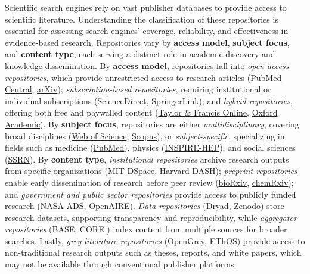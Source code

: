 Scientific search engines rely on vast publisher databases to provide access to scientific literature. Understanding the classification of these repositories is essential for assessing search engines' coverage, reliability, and effectiveness in evidence-based research. Repositories vary by \textbf{access model}, \textbf{subject focus}, and \textbf{content type}, each serving a distinct role in academic discovery and knowledge dissemination. By \textbf{access model}, repositories fall into \textit{open access repositories}, which provide unrestricted access to research articles (\eg \href{https://pubmed.ncbi.nlm.nih.gov/}{PubMed Central}, \href{https://arxiv.org/}{arXiv}); \textit{subscription-based repositories}, requiring institutional or individual subscriptions (\eg \href{https://www.sciencedirect.com/}{ScienceDirect}, \href{https://link.springer.com/}{SpringerLink}); and \textit{hybrid repositories}, offering both free and paywalled content (\eg \href{https://www.tandfonline.com/}{Taylor \& Francis Online}, \href{https://academic.oup.com/}{Oxford Academic}). By \textbf{subject focus}, repositories are either \textit{multidisciplinary}, covering broad disciplines (\eg \href{https://clarivate.com/academia-government/scientific-and-academic-research/research-discovery-and-referencing/web-of-science/}{Web of Science}, \href{https://www.scopus.com/home.uri}{Scopus}), or \textit{subject-specific}, specializing in fields such as medicine (\href{https://pubmed.ncbi.nlm.nih.gov/}{PubMed}), physics (\href{https://inspirehep.net/}{INSPIRE-HEP}), and social sciences (\href{https://www.ssrn.com/index.cfm/en/}{SSRN}). By \textbf{content type}, \textit{institutional repositories} archive research outputs from specific organizations (\eg \href{https://dspace.mit.edu/}{MIT DSpace}, \href{https://dash.harvard.edu/}{Harvard DASH}); \textit{preprint repositories} enable early dissemination of research before peer review (\eg \href{https://www.biorxiv.org/}{bioRxiv}, \href{https://chemrxiv.org/engage/chemrxiv/public-dashboard}{chemRxiv}); and \textit{government and public sector repositories} provide access to publicly funded research (\eg \href{https://ui.adsabs.harvard.edu/}{NASA ADS}, \href{https://www.openaire.eu/}{OpenAIRE}). \textit{Data repositories} (\eg \href{https://datadryad.org/stash}{Dryad}, \href{https://zenodo.org/}{Zenodo}) store research datasets, supporting transparency and reproducibility, while \textit{aggregator repositories} (\eg \href{https://www.base-search.net/}{BASE}, \href{https://core.ac.uk/}{CORE} \cite{knoth2023core}) index content from multiple sources for broader searches. Lastly, \textit{grey literature repositories} (\eg \href{https://opengrey.eu/}{OpenGrey}, \href{https://ethos.bl.uk/}{EThOS}) provide access to non-traditional research outputs such as theses, reports, and white papers, which may not be available through conventional publisher platforms.



